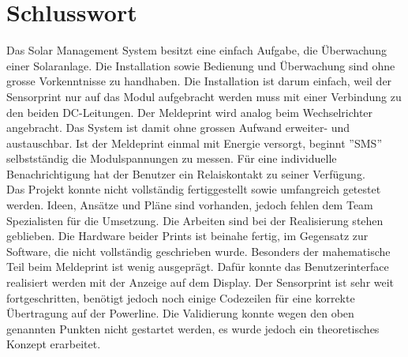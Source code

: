 \section{Schlusswort}
Das Solar Management System besitzt eine einfach Aufgabe, die Überwachung einer Solaranlage. Die Installation sowie Bedienung und Überwachung sind ohne grosse Vorkenntnisse zu handhaben. Die Installation ist darum einfach, weil der Sensorprint nur auf das Modul aufgebracht werden muss mit einer Verbindung zu den beiden DC-Leitungen. Der Meldeprint wird analog beim Wechselrichter angebracht. Das System ist damit ohne grossen Aufwand erweiter- und austauschbar. Ist der Meldeprint einmal mit Energie versorgt, beginnt ''SMS'' selbstständig die Modulspannungen zu messen. Für eine individuelle Benachrichtigung hat der Benutzer ein Relaiskontakt zu seiner Verfügung.\\
Das Projekt konnte nicht vollständig fertiggestellt sowie umfangreich getestet werden. Ideen, Ansätze und Pläne sind vorhanden, jedoch fehlen dem Team Spezialisten für die Umsetzung. Die Arbeiten sind bei der Realisierung stehen geblieben. Die Hardware beider Prints ist beinahe fertig, im Gegensatz zur Software, die nicht vollständig geschrieben wurde. Besonders der mahematische Teil beim Meldeprint ist wenig ausgeprägt. Dafür konnte das Benutzerinterface realisiert werden mit der Anzeige auf dem Display. Der Sensorprint ist sehr weit fortgeschritten, benötigt jedoch noch einige Codezeilen für eine korrekte Übertragung auf der Powerline.  Die Validierung konnte wegen den oben genannten Punkten nicht gestartet werden, es wurde jedoch ein theoretisches Konzept erarbeitet.